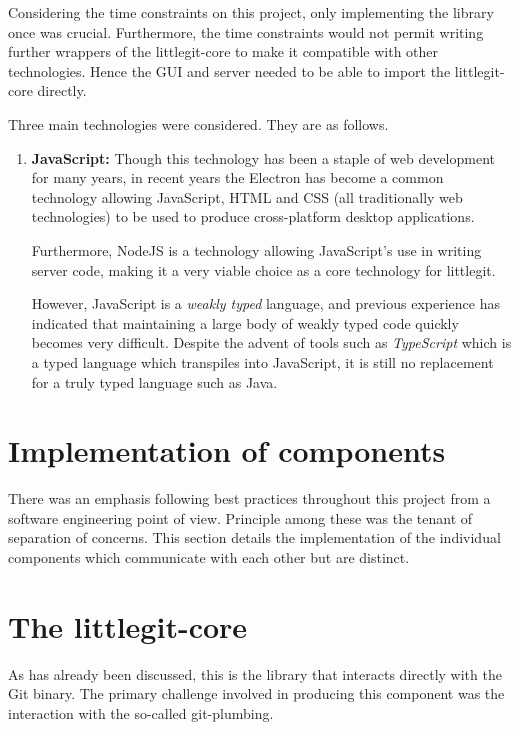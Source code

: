 Considering the time constraints on this project, only implementing the library once was crucial. Furthermore, the time constraints would not permit writing further wrappers of the littlegit-core to make it compatible with other technologies. Hence the GUI and server needed to be able to import the littlegit-core directly. 

Three main technologies were considered. They are as follows.

\begin{enumerate}
\item \textbf{JavaScript:} Though this technology has been a staple of web development for many years, in recent years the Electron \cite{electron} has become a common technology allowing JavaScript, HTML and CSS (all traditionally web technologies) to be used to produce cross-platform desktop applications.

Furthermore, NodeJS \cite{nodejs} is a technology allowing JavaScript's use in writing server code, making it a very viable choice as a core technology for littlegit. 

However, JavaScript is a \emph{weakly typed} language, and previous experience has indicated that maintaining a large body of weakly typed code quickly becomes very difficult. Despite the advent of tools such as \emph{TypeScript} which is a typed language which transpiles into JavaScript, it is still no replacement for a truly typed language such as Java.

\end{enumerate}


\section{Implementation of components}

There was an emphasis following best practices throughout this project from a software engineering point of view. Principle among these was the tenant of separation of concerns. This section details the implementation of the individual components which communicate with each other but are distinct. 

\section{The littlegit-core}

As has already been discussed, this is the library that interacts directly with the Git binary. The primary challenge involved in producing this component was the interaction with the so-called git-plumbing.

